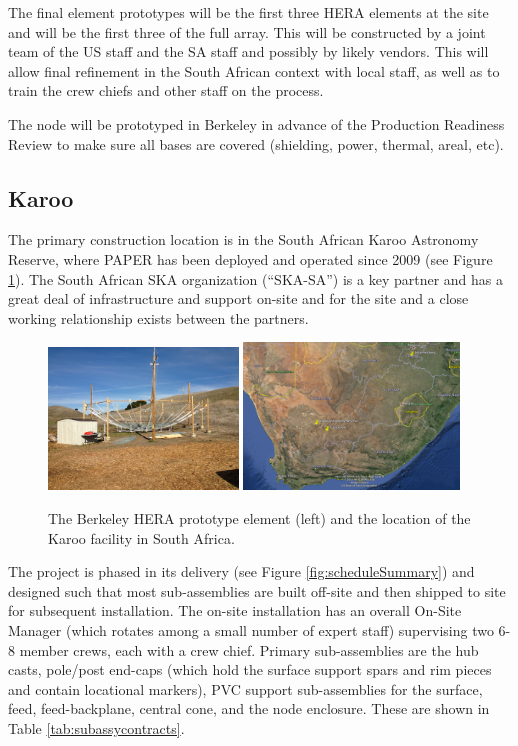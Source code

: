 \documentclass[preprint]{aastex}
\begin{document}
The final element prototypes will be the first three HERA elements at the site and will be the first three of the full
array.  This will be constructed by a joint team of the US staff and the SA staff and possibly by likely vendors.
This will allow final refinement in the South African context with local staff, as well as to train the crew chiefs
and other staff on the process.

The node will be prototyped in Berkeley in advance of the Production Readiness Review to make sure
all bases are covered (shielding, power, thermal, areal, etc).  

\subsection{Karoo}
The primary construction location is in the South African Karoo Astronomy Reserve, where PAPER has been deployed
and operated since 2009 (see Figure \ref{fig:heraclesANDkaroo}).  The South African SKA organization (``SKA-SA'') is a key partner and has a great deal of
infrastructure and support on-site and for the site and a close working relationship exists between the partners.

\begin{figure}[htb]
\centering
\includegraphics[width=0.45\textwidth]{plots/heracles.png}
\includegraphics[width=0.51\textwidth]{plots/karoo.png}
\caption{The Berkeley HERA prototype element (left) and the location of the Karoo facility in South Africa.}
\label{fig:heraclesANDkaroo}
\end{figure}

The project is phased in its delivery (see Figure \ref{fig:scheduleSummary}) and
designed such that most sub-assemblies are built off-site and then shipped to site
for subsequent installation. The on-site installation has an overall On-Site Manager
(which rotates among a small number of expert staff) supervising two 6-8 member
crews, each with a crew chief. Primary sub-assemblies are the hub casts, pole/post
end-caps (which hold the surface support spars and rim pieces and contain locational
markers), PVC support sub-assemblies for the surface, feed, feed-backplane, central
cone, and the node enclosure. These are shown in Table \ref{tab:subassycontracts}.
\end{document}
